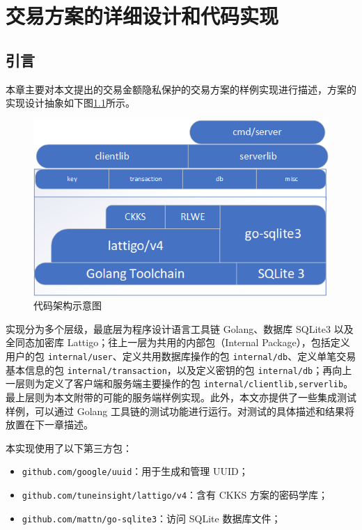 \chapter{交易方案的详细设计和代码实现}

\section{引言}

本章主要对本文提出的交易金额隐私保护的交易方案的样例实现进行描述，方案的实现设计抽象如下图\ref*{Fig:Design}所示。

\begin{figure}[ht]
    \centering
    \includegraphics[width=0.8\linewidth]{Figures/abstract_on_chimata.png}
    \caption{代码架构示意图}\label{Fig:Design}
\end{figure}

实现分为多个层级，最底层为程序设计语言工具链 Golang、数据库 SQLite3 以及全同态加密库 Lattigo；往上一层为共用的内部包（Internal Package），包括定义用户的包 \verb|internal/user|、定义共用数据库操作的包 \verb|internal/db|、定义单笔交易基本信息的包 \verb|internal/transaction|，以及定义密钥的包 \verb|internal/db|；再向上一层则为定义了客户端和服务端主要操作的包 \verb|internal/clientlib,serverlib|。最上层则为本文附带的可能的服务端样例实现。此外，本文亦提供了一些集成测试样例，可以通过 Golang 工具链的测试功能进行运行。对测试的具体描述和结果将放置在下一章描述。

本实现使用了以下第三方包：

\begin{itemize}
    \item \verb|github.com/google/uuid|：用于生成和管理 UUID；
    \item \verb|github.com/tuneinsight/lattigo/v4|：含有 CKKS 方案的密码学库；
    \item \verb|github.com/mattn/go-sqlite3|：访问 SQLite 数据库文件；
\end{itemize}

